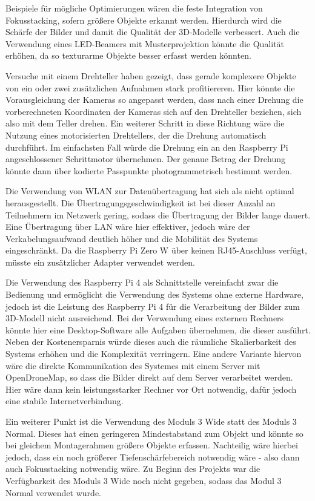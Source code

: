 \documentclass[./00PhotoBox.tex]{subfiles}
\begin{document}
Beispiele für mögliche Optimierungen wären die feste Integration von Fokusstacking, sofern größere Objekte erkannt werden. Hierdurch wird die Schärfe der Bilder und damit die Qualität der 3D-Modelle verbessert. Auch die Verwendung eines LED-Beamers mit Musterprojektion könnte die Qualität erhöhen, da so texturarme Objekte besser erfasst werden könnten.

Versuche mit einem Drehteller haben gezeigt, dass gerade komplexere Objekte von ein oder zwei zusätzlichen Aufnahmen stark profitiereren. Hier könnte die Vorausgleichung der Kameras so angepasst werden, dass nach einer Drehung die vorberechneten Koordinaten der Kameras sich auf den Drehteller beziehen, sich also mit dem Teller drehen. Ein weiterer Schritt in diese Richtung wäre die Nutzung eines motorisierten Drehtellers, der die Drehung automatisch durchführt. Im einfachsten Fall würde die Drehung ein an den Raspberry Pi angeschlossener Schrittmotor übernehmen. Der genaue Betrag der Drehung könnte dann über kodierte Passpunkte photogrammetrisch bestimmt werden.

Die Verwendung von WLAN zur Datenübertragung hat sich als nicht optimal herausgestellt. Die Übertragungsgeschwindigkeit ist bei dieser Anzahl an Teilnehmern im Netzwerk gering, sodass die Übertragung der Bilder lange dauert. Eine Übertragung über LAN wäre hier effektiver, jedoch wäre der Verkabelungsaufwand deutlich höher und die Mobilität des Systems eingeschränkt. Da die Raspberry Pi Zero W über keinen RJ45-Anschluss verfügt, müsste ein zusätzlicher Adapter verwendet werden.

Die Verwendung des Raspberry Pi 4 als Schnittstelle vereinfacht zwar die Bedienung und ermöglicht die Verwendung des Systems ohne externe Hardware, jedoch ist die Leistung des Raspberry Pi 4 für die Verarbeitung der Bilder zum 3D-Modell nicht ausreichend. Bei der Verwendung eines externen Rechners könnte hier eine Desktop-Software alle Aufgaben übernehmen, die dieser ausführt. Neben der Kostenersparnis würde dieses auch die räumliche Skalierbarkeit des Systems erhöhen und die Komplexität verringern. Eine andere Variante hiervon wäre die direkte Kommunikation des Systemes mit einem Server mit OpenDroneMap, so dass die Bilder direkt auf dem Server verarbeitet werden. Hier wäre dann kein leistungsstarker Rechner vor Ort notwendig, dafür jedoch eine stabile Internetverbindung.

Ein weiterer Punkt ist die Verwendung des Moduls 3 Wide statt des Moduls 3 Normal. Dieses hat einen geringeren Mindestabstand zum Objekt und könnte so bei gleichem Montagerahmen größere Objekte erfassen. Nachteilig wäre hierbei jedoch, dass ein noch größerer Tiefenschärfebereich notwendig wäre - also dann auch Fokusstacking notwendig wäre. Zu Beginn des Projekts war die Verfügbarkeit des Moduls 3 Wide noch nicht gegeben, sodass das Modul 3 Normal verwendet wurde.




\biblio
\end{document}
